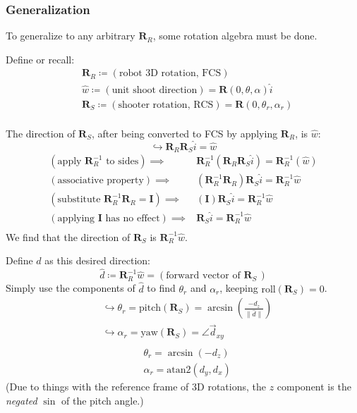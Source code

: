 \documentclass{article}
\begin{document}
\subsubsection*{Generalization}
To generalize to any arbitrary $\boldsymbol{R}_R$, some rotation algebra must be done.

Define or recall:
\begin{align*}
    &\boldsymbol{R}_R\coloneqq(\text{robot 3D rotation, FCS}) \\
    &\hat{w}\coloneqq(\text{unit shoot direction})=\boldsymbol{R}(0,\theta,\alpha)\hat{i} \\
    &\boldsymbol{R}_S\coloneqq(\text{shooter rotation, RCS})=\boldsymbol{R}(0,\theta_r,\alpha_r) \\
\end{align*}

The direction of $\boldsymbol{R}_S$, after being converted to FCS by applying $\boldsymbol{R}_R$, is $\hat{w}$:
\[ \hookrightarrow\boldsymbol{R}_R\boldsymbol{R}_S\hat{i}=\hat{w} \]
\begin{align*}
    (\text{apply }\boldsymbol{R}_R^{-1}\text{ to sides})\implies&\boldsymbol{R}_R^{-1}(\boldsymbol{R}_R\boldsymbol{R}_S\hat{i})=\boldsymbol{R}_R^{-1}(\hat{w}) \\
    (\text{associative property})\implies&(\boldsymbol{R}_R^{-1}\boldsymbol{R}_R)\boldsymbol{R}_S\hat{i}=\boldsymbol{R}_R^{-1}\hat{w} \\
    (\text{substitute }\boldsymbol{R}_R^{-1}\boldsymbol{R}_R=\boldsymbol{I})\implies&(\boldsymbol{I})\boldsymbol{R}_S\hat{i}=\boldsymbol{R}_R^{-1}\hat{w} \\
    (\text{applying }\boldsymbol{I}\text{ has no effect})\implies&\boldsymbol{R}_S\hat{i}=\boldsymbol{R}_R^{-1}\hat{w} \\
\end{align*}
We find that the direction of $\boldsymbol{R}_S$ is $\boldsymbol{R}_R^{-1}\hat{w}$.

Define $\hat{d}$ as this desired direction:
\[ \hat{d}\coloneqq\boldsymbol{R}_R^{-1}\hat{w}=(\text{forward vector of }\boldsymbol{R}_S\,) \]
Simply use the components of $\hat{d}$ to find $\theta_r$ and $\alpha_r$, keeping $\text{roll}(\boldsymbol{R}_S)=0$.
\begin{align*}
    &\hookrightarrow\theta_r=\text{pitch}(\boldsymbol{R}_S)=\arcsin\left(\frac{-d_z}{\lVert\hat{d}\rVert}\right) \\
    &\hookrightarrow\alpha_r=\text{yaw}(\boldsymbol{R}_S)=\angle{\vec{d}_{xy}} \\
\end{align*}
\begin{align*}
    &\boxed{\theta_r=\arcsin(-d_z)} \\
    &\boxed{\alpha_r=\text{atan2}(d_y,d_x)}
\end{align*}
(Due to things with the reference frame of 3D rotations, the $z$ component is the \textit{negated} $\sin$ of the pitch angle.)
\end{document}
